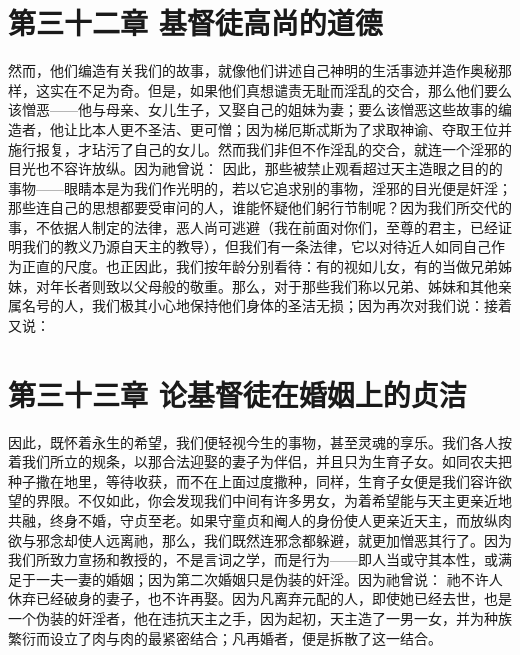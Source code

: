 
\section{第三十二章 基督徒高尚的道德}

然而，他们编造有关我们的故事，就像他们讲述自己神明的生活事迹并造作奥秘那样，这实在不足为奇。但是，如果他们真想谴责无耻而淫乱的交合，那么他们要么该憎恶——他与母亲、女儿生子，又娶自己的姐妹为妻；要么该憎恶这些故事的编造者，他让比本人更不圣洁、更可憎；因为梯厄斯忒斯为了求取神谕、夺取王位并施行报复，才玷污了自己的女儿。然而我们非但不作淫乱的交合，就连一个淫邪的目光也不容许放纵。因为祂曾说： 因此，那些被禁止观看超过天主造眼之目的的事物——眼睛本是为我们作光明的，若以它追求别的事物，淫邪的目光便是奸淫；那些连自己的思想都要受审问的人，谁能怀疑他们躬行节制呢？因为我们所交代的事，不依据人制定的法律，恶人尚可逃避（我在前面对你们，至尊的君主，已经证明我们的教义乃源自天主的教导），但我们有一条法律，它以对待近人如同自己作为正直的尺度。也正因此，我们按年龄分别看待：有的视如儿女，有的当做兄弟姊妹，对年长者则致以父母般的敬重。那么，对于那些我们称以兄弟、姊妹和其他亲属名号的人，我们极其小心地保持他们身体的圣洁无损；因为再次对我们说：接着又说：\par


\section{第三十三章 论基督徒在婚姻上的贞洁}

因此，既怀着永生的希望，我们便轻视今生的事物，甚至灵魂的享乐。我们各人按着我们所立的规条，以那合法迎娶的妻子为伴侣，并且只为生育子女。如同农夫把种子撒在地里，等待收获，而不在上面过度撒种，同样，生育子女便是我们容许欲望的界限。不仅如此，你会发现我们中间有许多男女，为着希望能与天主更亲近地共融，终身不婚，守贞至老。如果守童贞和阉人的身份使人更亲近天主，而放纵肉欲与邪念却使人远离祂，那么，我们既然连邪念都躲避，就更加憎恶其行了。因为我们所致力宣扬和教授的，不是言词之学，而是行为——即人当或守其本性，或满足于一夫一妻的婚姻；因为第二次婚姻只是伪装的奸淫。因为祂曾说： 祂不许人休弃已经破身的妻子，也不许再娶。因为凡离弃元配的人，即使她已经去世，也是一个伪装的奸淫者，他在违抗天主之手，因为起初，天主造了一男一女，并为种族繁衍而设立了肉与肉的最紧密结合；凡再婚者，便是拆散了这一结合。\par

